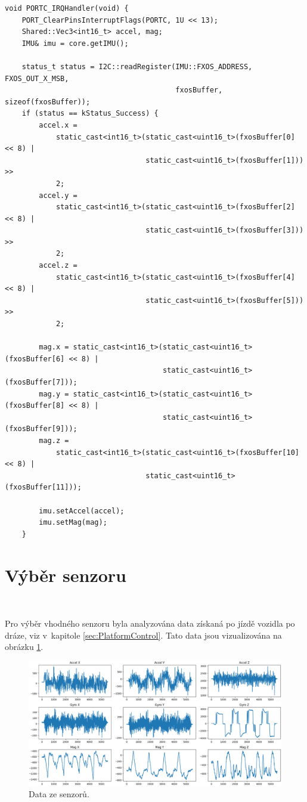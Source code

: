 \begin{lstlisting}[caption = Funkce obsluhy přerušení na portu C., label = lst:interruptC]
void PORTC_IRQHandler(void) {
    PORT_ClearPinsInterruptFlags(PORTC, 1U << 13);
    Shared::Vec3<int16_t> accel, mag;
    IMU& imu = core.getIMU();

    status_t status = I2C::readRegister(IMU::FXOS_ADDRESS, FXOS_OUT_X_MSB,
                                        fxosBuffer, sizeof(fxosBuffer));
    if (status == kStatus_Success) {
        accel.x =
            static_cast<int16_t>(static_cast<uint16_t>(fxosBuffer[0] << 8) |
                                 static_cast<uint16_t>(fxosBuffer[1])) >>
            2;
        accel.y =
            static_cast<int16_t>(static_cast<uint16_t>(fxosBuffer[2] << 8) |
                                 static_cast<uint16_t>(fxosBuffer[3])) >>
            2;
        accel.z =
            static_cast<int16_t>(static_cast<uint16_t>(fxosBuffer[4] << 8) |
                                 static_cast<uint16_t>(fxosBuffer[5])) >>
            2;

        mag.x = static_cast<int16_t>(static_cast<uint16_t>(fxosBuffer[6] << 8) |
                                     static_cast<uint16_t>(fxosBuffer[7]));
        mag.y = static_cast<int16_t>(static_cast<uint16_t>(fxosBuffer[8] << 8) |
                                     static_cast<uint16_t>(fxosBuffer[9]));
        mag.z =
            static_cast<int16_t>(static_cast<uint16_t>(fxosBuffer[10] << 8) |
                                 static_cast<uint16_t>(fxosBuffer[11]));

        imu.setAccel(accel);
        imu.setMag(mag);
    }
\end{lstlisting}

\section{Výběr senzoru}\

Pro výběr vhodného senzoru byla analyzována data získaná po jízdě vozidla po dráze,
viz v~kapitole \ref{sec:PlatformControl}. Tato data jsou vizualizována na obrázku
\ref{fig:Sensors}.
\begin{figure}[!h]
    \centering
    \includegraphics[width = 1\linewidth]{Figures/Sensors.png}
    \caption{Data ze senzorů.}
    \label{fig:Sensors}
\end{figure}

